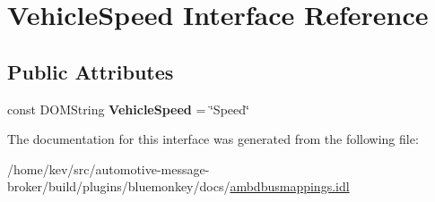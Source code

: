 \hypertarget{interfaceVehicleSpeed}{\section{Vehicle\+Speed Interface Reference}
\label{interfaceVehicleSpeed}
}
\subsection*{Public Attributes}
\begin{DoxyCompactItemize}
\item 
\hypertarget{interfaceVehicleSpeed_a414d86d8a52df7495cf6b462f89beded}{const D\+O\+M\+String {\bfseries Vehicle\+Speed} = \char`\"{}Speed\char`\"{}}\label{interfaceVehicleSpeed_a414d86d8a52df7495cf6b462f89beded}

\end{DoxyCompactItemize}


The documentation for this interface was generated from the following file\+:\begin{DoxyCompactItemize}
\item 
/home/kev/src/automotive-\/message-\/broker/build/plugins/bluemonkey/docs/\hyperlink{ambdbusmappings_8idl}{ambdbusmappings.\+idl}\end{DoxyCompactItemize}
